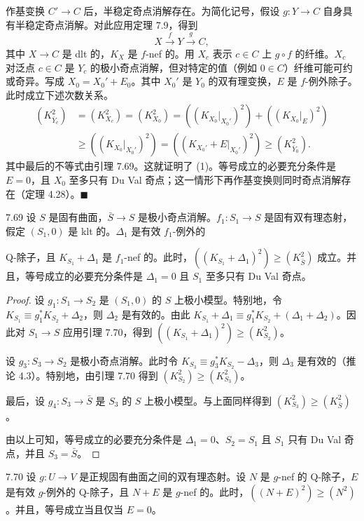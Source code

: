作基变换 $C'\to C$ 后，半稳定奇点消解存在。为简化记号，假设 $g\colon Y\to C$ 自身具有半稳定奇点消解。对此应用定理 7.9，得到
\[
X\xrightarrow{f}Y\xrightarrow{g}C,
\]
其中 $X\to C$ 是 dlt 的，$K_X$ 是 $f$-nef 的。用 $X_c$ 表示 $c\in C$ 上 $g\circ f$ 的纤维。$X_c$ 对泛点 $c\in C$ 是 $Y_c$ 的极小奇点消解，但对特定的值（例如 $0\in C$）纤维可能可约或奇异。写成 $X_0=X_0'+E_0$。其中 $X_0'$ 是 $Y_0$ 的双有理变换，$E$ 是 $f$-例外除子。此时成立下述次数关系。
\[
\begin{aligned}
(K_{\bar Y_c}^2)&=(K_{X_c}^2)=(K_{X_0}^2)=((K_{X_0}|_{X_0'})^2)+((K_{X_0}|_E)^2)\\
&\ge((K_{X_0}|_{X_0'})^2)=((K_{X_0'}+E|_{X_0'})^2)\ge(K_{\bar Y_0}^2).
\end{aligned}
\]
其中最后的不等式由引理 7.69。这就证明了 (1)。等号成立的必要充分条件是 $E=0$，且 $X_0$ 至多只有 Du Val 奇点；这一情形下再作基变换则同时奇点消解存在（定理 4.28）。\hfill$\blacksquare$

\begin{lemmap}{7.69}
设 $S$ 是固有曲面，$\bar S\to S$ 是极小奇点消解。$f_1\colon S_1\to S$ 是固有双有理态射，假定 $(S_1,0)$ 是 klt 的。$\Delta_1$ 是有效 $f_1$-例外的

Q-除子，且 $K_{S_1}+\Delta_1$ 是 $f_1$-nef 的。此时，$((K_{S_1}+\Delta_1)^2)\ge(K_{\bar S}^2)$ 成立。并且，等号成立的必要充分条件是 $\Delta_1=0$ 且 $S_1$ 至多只有 Du Val 奇点。
\end{lemmap}

\begin{proof}
设 $g_1\colon S_1\to S_2$ 是 $(S_1,0)$ 的 $S$ 上极小模型。特别地，令 $K_{S_1}\equiv g_1^*K_{S_2}+\Delta_2$，则 $\Delta_2$ 是有效的。由此 $K_{S_1}+\Delta_1\equiv g_1^*K_{S_2}+(\Delta_1+\Delta_2)$。因此对 $S_1\to S$ 应用引理 7.70，得到 $((K_{S_1}+\Delta_1)^2)\ge(K_{S_2}^2)$。

设 $g_3\colon S_3\to S_2$ 是极小奇点消解。此时令 $K_{S_3}\equiv g_3^*K_{S_2}-\Delta_3$，则 $\Delta_3$ 是有效的（推论 4.3）。特别地，由引理 7.70 得到 $(K_{S_2}^2)\ge(K_{S_3}^2)$。

最后，设 $g_4\colon S_3\to\bar S$ 是 $S_3$ 的 $S$ 上极小模型。与上面同样得到 $(K_{S_3}^2)\ge(K_{\bar S}^2)$。

由以上可知，等号成立的必要充分条件是 $\Delta_1=0$、$S_2=S_1$ 且 $S_1$ 只有 Du Val 奇点，并且 $S_3=\bar S$。
\end{proof}

\begin{lemmap}{7.70}
设 $g\colon U\to V$ 是正规固有曲面之间的双有理态射。设 $N$ 是 $g$-nef 的 Q-除子，$E$ 是有效 $g$-例外的 Q-除子，且 $N+E$ 是 $g$-nef 的。此时，$((N+E)^2)\ge(N^2)$。并且，等号成立当且仅当 $E=0$。
\end{lemmap}

